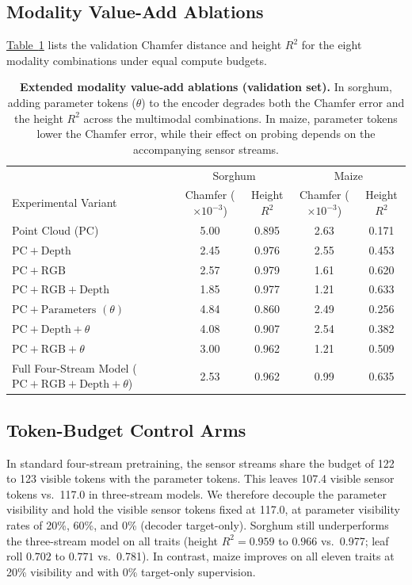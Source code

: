 \documentclass[10pt,twocolumn,letterpaper]{article}
\newcommand{\tabref}[1]{\hyperref[#1]{Table~\ref*{#1}}}
\begin{document}
\subsection{Modality Value-Add Ablations}
\tabref{tab:supp-e2} lists the validation Chamfer distance and height $R^2$ for the eight modality combinations under equal compute budgets.

\begin{table}[t]
  \caption{\textbf{Extended modality value-add ablations (validation set).} In sorghum, adding parameter tokens ($\theta$) to the encoder degrades both the Chamfer error and the height $R^2$ across the multimodal combinations. In maize, parameter tokens lower the Chamfer error, while their effect on probing depends on the accompanying sensor streams.}
  \label{tab:supp-e2}
  \centering\small
  \begin{tabular}{lcccc}
  \toprule
   & \multicolumn{2}{c}{Sorghum} & \multicolumn{2}{c}{Maize} \\
  Experimental Variant & Chamfer ($\times10^{-3}$) & Height $R^2$ & Chamfer ($\times10^{-3}$) & Height $R^2$ \\
  \midrule
  Point Cloud ($\mathrm{PC}$) & 5.00 & 0.895 & 2.63 & 0.171 \\
  $\mathrm{PC} + \text{Depth}$ & 2.45 & 0.976 & 2.55 & 0.453 \\
  $\mathrm{PC} + \text{RGB}$ & 2.57 & 0.979 & 1.61 & 0.620 \\
  $\mathrm{PC} + \text{RGB} + \text{Depth}$ & 1.85 & 0.977 & 1.21 & 0.633 \\
  $\mathrm{PC} + \text{Parameters } (\theta)$ & 4.84 & 0.860 & 2.49 & 0.256 \\
  $\mathrm{PC} + \text{Depth} + \theta$ & 4.08 & 0.907 & 2.54 & 0.382 \\
  $\mathrm{PC} + \text{RGB} + \theta$ & 3.00 & 0.962 & 1.21 & 0.509 \\
  Full Four-Stream Model ($\mathrm{PC} + \text{RGB} + \text{Depth} + \theta$) & 2.53 & 0.962 & 0.99 & 0.635 \\
  \bottomrule
  \end{tabular}
\end{table}

\subsection{Token-Budget Control Arms}
In standard four-stream pretraining, the sensor streams share the budget of 122 to 123 visible tokens with the parameter tokens. This leaves 107.4 visible sensor tokens vs.\ 117.0 in three-stream models. We therefore decouple the parameter visibility and hold the visible sensor tokens fixed at 117.0, at parameter visibility rates of 20\%, 60\%, and 0\% (decoder target-only). Sorghum still underperforms the three-stream model on all traits (height $R^2 = 0.959$ to $0.966$ vs.\ 0.977; leaf roll $0.702$ to $0.771$ vs.\ 0.781). In contrast, maize improves on all eleven traits at 20\% visibility and with 0\% target-only supervision.
\end{document}
